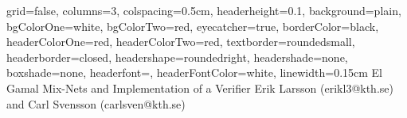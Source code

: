 \documentclass[a0paper,landscape,margin=30pt,movebody=50pt]{baposter}
\begin{document}
\begin{poster}{
grid=false,
columns=3,
colspacing=0.5cm,
headerheight=0.1\textheight,
background=plain,
bgColorOne=white,
bgColorTwo=red,
eyecatcher=true,
borderColor=black,
headerColorOne=red,
headerColorTwo=red,
textborder=roundedsmall,
headerborder=closed,
headershape=roundedright,
headershade=none,
boxshade=none,
headerfont=\sc,
headerFontColor=white,
linewidth=0.15cm
}
{}
{El Gamal Mix-Nets and Implementation of a Verifier}
{Erik Larsson (erikl3@kth.se) and Carl Svensson (carlsven@kth.se)}
{}



\end{poster}
\end{document}
